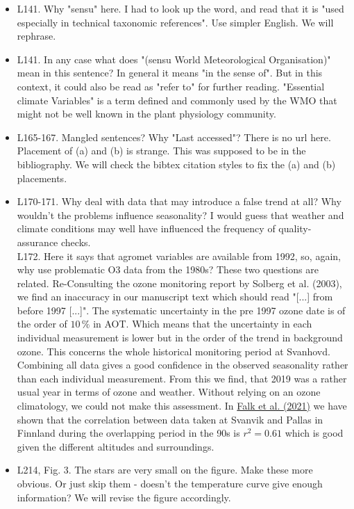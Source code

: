 \documentclass{scrartcl}
\begin{document}
\begin{itemize}
\item {\color{blue}L141. Why "sensu" here. I had to look up the word, and read that it is "used especially in technical taxonomic references". Use simpler English.}
We will rephrase.

\item {\color{blue}L141. In any case what does "(sensu World Meteorological Organisation)" mean in this sentence?}
In general it means "in the sense of". But in this context, it could also be read as "refer to" for further reading. "Essential climate Variables" is a term defined and commonly used by the WMO that might not be well known in the plant physiology community.

\item {\color{blue}L165-167. Mangled sentences? Why "Last accessed"? There is no url here. Placement of (a) and (b) is strange.}
This was supposed to be in the bibliography. We will check the bibtex citation styles to fix the (a) and (b) placements.

\item {\color{blue}L170-171. Why deal with data that may introduce a false trend at all? Why wouldn't the problems influence seasonality? I would guess that weather and climate conditions may well have influenced the frequency of quality-assurance checks.\\
L172. Here it says that agromet variables are available from 1992, so, again, why use problematic O3 data from the 1980s?}
These two questions are related. Re-Consulting the ozone monitoring report by Solberg et al. (2003), we find an inaccuracy in our manuscript text which should read "[...] from before 1997 [...]". The systematic uncertainty in the pre 1997 ozone date is of the order of $10\,\%$ in AOT. Which means that the uncertainty in each individual measurement is lower but in the order of the trend in background ozone. This concerns the whole historical monitoring period at Svanhovd. Combining all data gives a good confidence in the observed seasonality rather than each individual measurement. From this we find, that 2019 was a rather usual year in terms of ozone and weather. Without relying on an ozone climatology, we could not make this assessment. In \href{https://acp.copernicus.org/articles/21/15647/2021/}{Falk et al. (2021)} we have shown that the correlation between data taken at Svanvik and Pallas in Finnland during the overlapping period in the 90s is $r^2=0.61$ which is good given the different altitudes and surroundings.

\item {\color{blue}L214, Fig. 3. The stars are very small on the figure. Make these more obvious. Or just skip them - doesn't the temperature curve give enough information?}
We will revise the figure accordingly.


\end{itemize}
\end{document}
